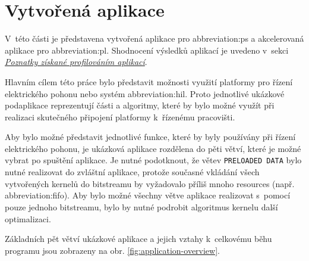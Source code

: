 \documentclass[a4paper, twoside, 11pt]{article}
\begin{document}
\section{Vytvořená aplikace}\label{sec:vytvorena-aplikace}
 V~této části je představena vytvořená aplikace pro \gls{abbreviation:ps} a akcelerovaná aplikace pro \gls{abbreviation:pl}. Shodnocení výsledků aplikací je uvedeno v~sekci \hyperref[sec:poznatky-ziskane-profilovanim-aplikaci]{\textit{Poznatky získané profilováním aplikací}}.\par
 Hlavním cílem této práce bylo představit možnosti využití platformy pro řízení elektrického pohonu nebo systém \gls{abbreviation:hil}. Proto jednotlivé ukázkové podaplikace reprezentují části a algoritmy, které by bylo možné využít při realizaci skutečného připojení platformy k~řízenému pracovišti.\par
 Aby bylo možné představit jednotlivé funkce, které by byly používány při řízení elektrického pohonu, je ukázková aplikace rozdělena do pěti větví, které je možné vybrat po spuštění aplikace. Je nutné podotknout, že větev \texttt{PRELOADED DATA} bylo nutné realizovat do zvláštní aplikace, protože současné vkládání všech vytvořených kernelů do bitstreamu by vyžadovalo příliš mnoho resources (např. \gls{abbreviation:fifo}). Aby bylo možné všechny větve aplikace realizovat s~pomocí pouze jednoho bitstreamu, bylo by nutné podrobit algoritmus kernelu další optimalizaci.\par
 Základních pět větví ukázkové aplikace a jejich vztahy k~celkovému běhu programu jsou zobrazeny na obr. \ref{fig:application-overview}.
\end{document}
